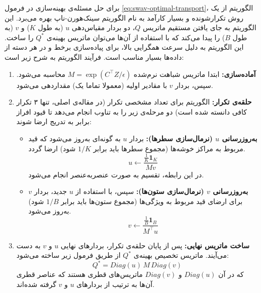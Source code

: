 برای حل مسئله‌ی بهینه‌سازی در فرمول \ref{eq:swav-optimal-transport}،
الگوریتم  از یک روش تکرارشونده و بسیار کارآمد به نام الگوریتم سینک‌هورن-ناپ\label{sec:sinkhorn}\cite{cuturi2013sinkhorn} بهره می‌برد.
این الگوریتم به جای یافتن مستقیم ماتریس 
$Q$، دو بردار مقیاس‌دهی 
$u$
(به طول $K$) و $v$ (به طول $B$)
را پیدا می‌کند که با استفاده از آن‌ها می‌توان ماتریس بهینه‌ی $Q^*$ را ساخت. این الگوریتم به دلیل سرعت همگرایی بالا، برای پیاده‌سازی برخط و در هر دسته از داده‌ها بسیار مناسب است. فرآیند الگوریتم به شرح زیر است:

\begin{enumerate}
    \item \textbf{آماده‌سازی:} ابتدا ماتریس شباهت نرم‌شده $M = \exp(C^\top Z / \epsilon)$ محاسبه می‌شود. سپس، بردار 
    $v$
    با مقادیر اولیه (معمولا تماما یک) مقداردهی می‌شود.
    \item \textbf{حلقه‌ی تکرار:} الگوریتم برای تعداد مشخصی تکرار (در مقاله‌ی اصلی، تنها ۳ تکرار کافی دانسته شده است) دو مرحله‌ی زیر را به تناوب انجام می‌دهد تا قیود افراز برابر به تدریج ارضا شوند:
    \begin{itemize}
	\item \textbf{به‌روزرسانی $u$ (نرمال‌سازی سطرها):} بردار $u$ به گونه‌ای به‌روز می‌شود که قید مربوط به مراکز خوشه‌ها (مجموع سطرها باید برابر $1/K$ شود) ارضا گردد.
	\begin{equation}
		u \leftarrow \frac{\frac{1}{K} \mathbf{1}_K}{M v}
		\label{eq:update_u}
	\end{equation}
	در این رابطه، تقسیم به صورت عنصربه‌عنصر انجام می‌شود.
	
	\item \textbf{به‌روزرسانی $v$ (نرمال‌سازی ستون‌ها):} سپس، با استفاده از $u$ جدید، بردار $v$ برای ارضای قید مربوط به ویژگی‌ها (مجموع ستون‌ها باید برابر $1/B$ شود) به‌روز می‌شود.
	\begin{equation}
		v \leftarrow \frac{\frac{1}{B} \mathbf{1}_B}{M^\top u}
		\label{eq:update_v}
	\end{equation}
\end{itemize}

\item \textbf{ساخت ماتریس نهایی:} پس از پایان حلقه‌ی تکرار، بردارهای نهایی $u$ و $v$ به دست می‌آیند. ماتریس تخصیص بهینه‌ی $Q^*$ از طریق فرمول زیر ساخته می‌شود:
\begin{equation}
	Q^* = Diag(u) \, M \, Diag(v)
	\label{eq:final_q}
\end{equation}
که در آن $Diag(u)$ و $Diag(v)$ ماتریس‌های قطری هستند که عناصر قطری آن‌ها به ترتیب از بردارهای $u$ و $v$ گرفته شده‌اند.
\end{enumerate}

